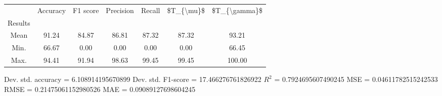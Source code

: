 \begin{tabular}{|c|c|c|c|c|c|c|}
\toprule
{} &  Accuracy &  F1 score &  Precision &  Recall &  \$T\_\{\textbackslash mu\}\$ &  \$T\_\{\textbackslash gamma\}\$ \\
Results &           &           &            &         &            &               \\
\hline
Mean    &     91.24 &     84.87 &      86.81 &   87.32 &      87.32 &         93.21 \\
Min.    &     66.67 &      0.00 &       0.00 &    0.00 &       0.00 &         66.45 \\
Max.    &     94.41 &     91.94 &      98.63 &   99.45 &      99.45 &        100.00 \\
\bottomrule
\end{tabular}

 Dev. std. accuracy = 6.108914195670899
 Dev. std. F1-score = 17.466276761826922
 $R^2$ = 0.7924695607490245
 MSE = 0.04611782515242533
 RMSE = 0.21475061152980526
 MAE = 0.09089127698604245